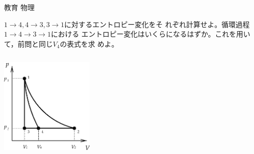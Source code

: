 \documentclass[fleqn]{jbook}
\begin{document}
\begin{question}{教育 物理}{}
\begin{subquestions}
{\begin{subsubquestions}
\SubSubQuestion
 $1\rightarrow4,4\rightarrow3,3\rightarrow1$に対するエントロピー変化をそ
れぞれ計算せよ。循環過程$1\rightarrow4\rightarrow3\rightarrow1$における
エントロピー変化はいくらになるはずか。これを用いて，前問と同じ$V_4$の表式を求
めよ。
\end{subsubquestions}}
\parbox[t]{50mm}{
\begin{center}
\includegraphics[clip,height=53mm,width=45mm]{1992phys-2.eps}
\end{center}
}

\end{subquestions}
\end{question}
\end{document}
